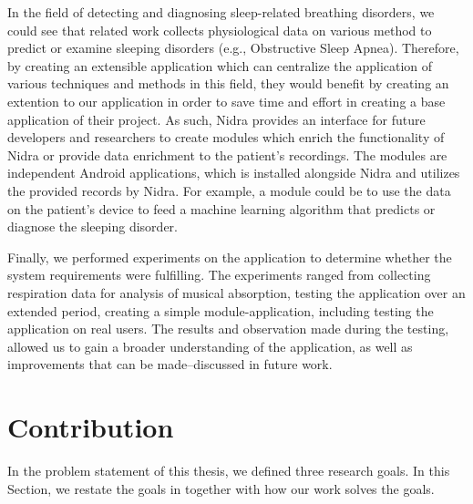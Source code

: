In the field of detecting and diagnosing sleep-related breathing disorders, we could see that related work collects physiological data on various method to predict or examine sleeping disorders (e.g., Obstructive Sleep Apnea). Therefore, by creating an extensible application which can centralize the application of various techniques and methods in this field, they would benefit by creating an extention to our application in order to save time and effort in creating a base application of their project. As such, Nidra provides an interface for future developers and researchers to create modules which enrich the functionality of Nidra or provide data enrichment to the patient's recordings. The modules are independent Android applications, which is installed alongside Nidra and utilizes the provided records by Nidra.  For example, a module could be to use the data on the patient's device to feed a machine learning algorithm that predicts or diagnose the sleeping disorder.  

Finally, we performed experiments on the application to determine whether the system requirements were fulfilling. The experiments ranged from collecting respiration data for analysis of musical absorption, testing the application over an extended period, creating a simple module-application, including testing the application on real users. The results and observation made during the testing, allowed us to gain a broader understanding of the application, as well as improvements that can be made--discussed in future work. 

\section{Contribution}
In the problem statement of this thesis, we defined three research goals. In this Section, we restate the goals in together with how our work solves the goals. 


